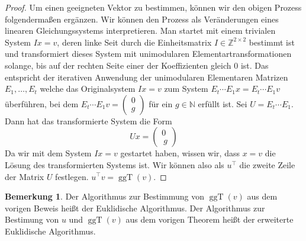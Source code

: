 \documentclass[
a4paper,landscape,16pt,
bibliography=totocnumbered,
numbers=noenddot,
]{scrartcl}
\numberwithin{equation}{subsection}
\newcommand{\N}{\mathbb N}
\newcommand{\Z}{\mathbb Z}
\newcommand{\ggT}{\operatorname{ggT}} %
\theoremstyle{plain}
\theoremstyle{definition}
\newtheorem*{bem}{Bemerkung}
\begin{document}
\begin{proof}
	Um einen geeigneten Vektor zu bestimmen, können wir den obigen Prozess folgendermaßen ergänzen. Wir können den Prozess als Veränderungen eines linearen Gleichungssystems interpretieren. Man startet mit einem trivialen System $I x = v$, deren linke Seit durch die Einheitsmatrix $I \in \Z^{2 \times 2}$ bestimmt ist und transformiert dieses System mit unimodularen Elementartransformationen solange, bis auf der rechten Seite einer der Koeffizienten gleich $0$ ist. Das entspricht der iterativen Anwendung der unimodularen Elementaren Matrizen $E_1,\ldots,E_t$ welche das Originalsystem $Ix = v$ zum System $E_t \cdots E_1 x = E_t \cdots E_1 v$  überführen, bei dem $E_ t \cdots E_1 v = \begin{pmatrix} 0 \\ g \end{pmatrix}$ für ein $g \in \N$ erfüllt ist. Sei $U = E_t \cdots E_1$. Dann hat das transformierte System die Form 
	\[
			U x = \begin{pmatrix} 0 \\\ g  \end{pmatrix} 
	\]
Da wir mit dem System $I x = v$ gestartet haben, wissen wir, dass $x=v$ die Lösung des transformierten Systems ist. Wir können also als $u^\top$ die zweite Zeile der Matrix $U$ festlegen. 
$u^\top v = \ggT(v)$. 
\end{proof} 

\begin{bem} 
Der Algorithmus zur Bestimmung von $\ggT(v)$ aus dem vorigen Beweis heißt der Euklidische Algorithmus. Der Algorithmus zur Bestimung von $u$ und $\ggT(v)$ aus dem vorigen Theorem heißt der erweiterte Euklidische Algorithmus. 
\end{bem} 
\end{document}
